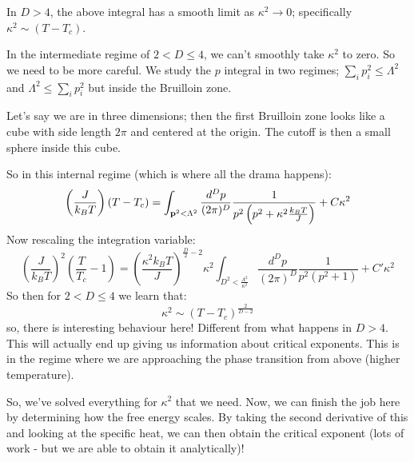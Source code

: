 In $D > 4$, the above integral has a smooth limit as $\kappa^2 \to 0$; specifically $\kappa^2 \sim (T - T_c)$.

In the intermediate regime of $2 < D \leq 4$, we can't smoothly take $\kappa^2$ to zero. So we need to be more careful. We study the $p$ integral in two regimes; $\sum_i p_i^2 \leq \Lambda^2$ and $\Lambda^2 \leq \sum_i p_i^2$ but inside the Bruilloin zone.

Let's say we are in three dimensions; then the first Bruilloin zone looks like a cube with side length $2\pi$ and centered at the origin. The cutoff is then a small sphere inside this cube. 

So in this internal regime (which is where all the drama happens):
\begin{equation}
    \left(\frac{J}{k_B T}\right)(T - T_c) = \int_{\mathbf{p}^2 < \Lambda^2}\frac{d^Dp}{(2\pi)^D}\frac{1}{p^2\left(p^2 + \kappa^2 \frac{k_B T}{J}\right)} + C\kappa^2
\end{equation}
Now rescaling the integration variable:
\begin{equation}
    \left(\frac{J}{k_B T}\right)^2\left(\frac{T}{T_c} - 1\right) = \left(\frac{\kappa^2 k_B T}{J}\right)^{\frac{D}{2} - 2} \kappa^2 \int_{D^2 < \frac{\Lambda^2}{\kappa^2}}\frac{d^Dp}{(2\pi)^D}\frac{1}{p^2(p^2 + 1)} + C'\kappa^2
\end{equation}
So then for $2 < D \leq 4$ we learn that:
\begin{equation}
    \kappa^2 \sim (T - T_c)^{\frac{2}{D-2}}
\end{equation}
so, there is interesting behaviour here! Different from what happens in $D > 4$. This will actually end up giving us information about critical exponents. This is in the regime where we are approaching the phase transition from above (higher temperature).

So, we've solved everything for $\kappa^2$ that we need. Now, we can finish the job here by determining how the free energy scales. By taking the second derivative of this and looking at the specific heat, we can then obtain the critical exponent (lots of work - but we are able to obtain it analytically)!

